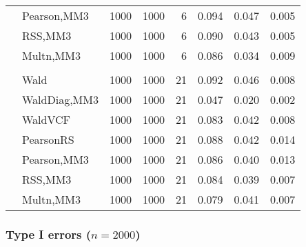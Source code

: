 \documentclass[
]{article}
\begin{document}
\begin{table}[H]
{\begin{tabular}[t]{llrrrrrr}
\hspace{1em} & Pearson,MM3 & 1000 & 1000 & 6 & 0.094 & 0.047 & 0.005\\

\hspace{1em} & RSS,MM3 & 1000 & 1000 & 6 & 0.090 & 0.043 & 0.005\\

\hspace{1em} & Multn,MM3 & 1000 & 1000 & 6 & 0.086 & 0.034 & 0.009\\
\cmidrule{1-8}
\addlinespace[0.3em]
\multicolumn{8}{l}{\textbf{3F 15V}}\\
\hspace{1em} & Wald & 1000 & 1000 & 21 & 0.092 & 0.046 & 0.008\\

\hspace{1em} & WaldDiag,MM3 & 1000 & 1000 & 21 & 0.047 & 0.020 & 0.002\\

\hspace{1em} & WaldVCF & 1000 & 1000 & 21 & 0.083 & 0.042 & 0.008\\

\hspace{1em} & PearsonRS & 1000 & 1000 & 21 & 0.088 & 0.042 & 0.014\\

\hspace{1em} & Pearson,MM3 & 1000 & 1000 & 21 & 0.086 & 0.040 & 0.013\\

\hspace{1em} & RSS,MM3 & 1000 & 1000 & 21 & 0.084 & 0.039 & 0.007\\

\hspace{1em} & Multn,MM3 & 1000 & 1000 & 21 & 0.079 & 0.041 & 0.007\\
\bottomrule
\end{tabular}}
\end{table}

\hypertarget{type-i-errors-n2000}{%
\subsubsection{\texorpdfstring{Type I errors
(\(n=2000\))}{Type I errors (n=2000)}}\label{type-i-errors-n2000}}
\end{document}
